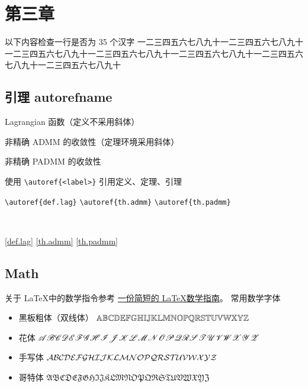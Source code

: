 \chapter{第三章}

以下内容检查一行是否为 35 个汉字
\newline
一二三四五六七八九十一二三四五六七八九十一二三四五六七八九十一二三四五六七八九十一二三四五六七八九十一二三四五六七八九十一二三四五六七八九十

\section{引理 autorefname}

\begin{definition}[Lagrangian]\label{def.lag}
    Lagrangian 函数（定义不采用斜体）
\end{definition}

\begin{theorem}[ADMM]\label{th.admm}
    非精确 ADMM 的收敛性（定理环境采用斜体）
\end{theorem}

\begin{lemma}[PADMM]\label{th.padmm}
    非精确 PADMM 的收敛性
\end{lemma}

使用 \verb|\autoref{<label>}| 引用定义、定理、引理

\vspace{10bp}

\begin{minipage}{.3\textwidth}
    \verb|\autoref{def.lag}|\newline
    \verb|\autoref{th.admm}|\newline
    \verb|\autoref{th.padmm}|
\end{minipage}
~~~~
\begin{minipage}{.3\textwidth}
    \autoref{def.lag}\newline
    \autoref{th.admm}\newline
    \autoref{th.padmm}
\end{minipage}

\section{Math}

关于 \LaTeX 中的数学指令参考 \href{https://mirrors.sjtug.sjtu.edu.cn/ctan/info/short-math-guide/}{一份简短的 \LaTeX 数学指南}。
常用数学字体
\begin{itemize}
    \item 黑板粗体（双线体） $\mathbb{ABCDEFGHIJKLMNOPQRSTUVWXYZ}$
    \item 花体 $\mathscr{ABCDEFGHIJKLMNOPQRSTUVWXYZ}$
    \item 手写体 $\mathcal{ABCDEFGHIJKLMNOPQRSTUVWXYZ}$
    \item 哥特体 $\mathfrak{ABCDEFGHIJKLMNOPQRSTUVWXYZ}$
\end{itemize}


